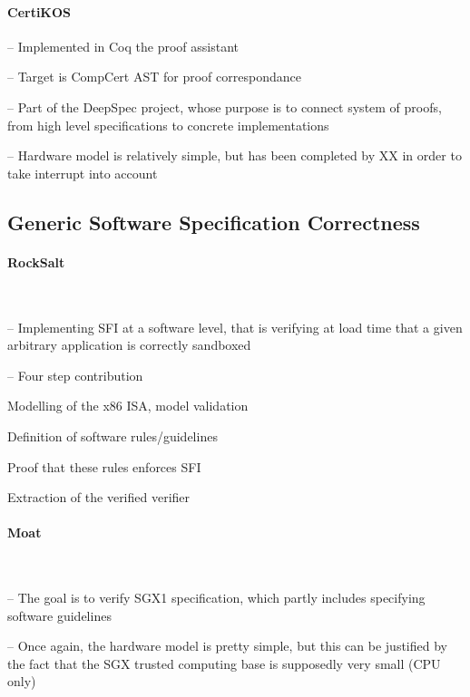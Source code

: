 \paragraph{CertiKOS}
%
\begin{compactitem}
\item[--] Implemented in Coq the proof assistant
\item[--] Target is CompCert AST for proof correspondance
\item[--] Part of the DeepSpec project, whose purpose is to connect system of
  proofs, from high level specifications to concrete implementations
\item[--] Hardware model is relatively simple, but has been completed by XX in
  order to take interrupt into account
\end{compactitem}

\subsection{Generic Software Specification Correctness}

\paragraph{RockSalt}\,\cite{morrisett2012rocksalt}
%
\begin{compactitem}
\item[--] Implementing SFI at a software level, that is verifying at load time
  that a given arbitrary application is correctly sandboxed
\item[--] Four step contribution
  \begin{compactenum}
  \item Modelling of the x86 ISA, model validation
  \item Definition of software rules/guidelines
  \item Proof that these rules enforces SFI
  \item Extraction of the verified verifier
  \end{compactenum}
\end{compactitem}

\paragraph{Moat}\,\cite{sinha2015moat}
%
\begin{compactitem}
\item[--] The goal is to verify SGX1 specification, which partly includes
  specifying software guidelines
\item[--] Once again, the hardware model is pretty simple, but this can be
  justified by the fact that the SGX trusted computing base is supposedly very
  small (CPU only)
\end{compactitem}

